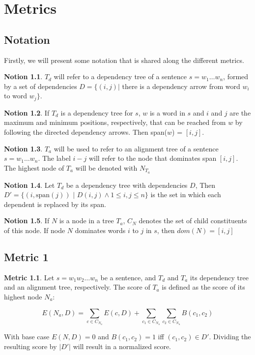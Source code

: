 \documentclass{report}
\theoremstyle{definition}
\newtheorem{metric}{Metric}
\newtheorem{notion}{Notion}
\theoremstyle{plain}
\begin{document}
\appendix
\chapter{Metrics}

\section{Notation}

Firstly, we will present some notation that is shared along the different metrics.

\begin{notion}
$T_d$ will refer to a dependency tree of a sentence $s = w_1 \dots w_n$, formed by a set of dependencies $D = \{ (i,j) |$ there is a dependency arrow from word $w_i$ to word $w_j \}$.
\end{notion}

\begin{notion}
If $T_d$ is a dependency tree for $s$, $w$ is a word in $s$ and $i$ and $j$ are the maximum and minimum positions, respectively, that can be reached from $w$ by following the directed dependency arrows. Then span($w$) = $[i,j]$.
\end{notion}

\begin{notion}
$T_a$ will be used to refer to an alignment tree of a sentence $s = w_1 \dots w_n$. The label $i-j$ will refer to the node that dominates span $[i,j]$. The highest node of $T_a$ will be denoted with $N_{T_a}$
\end{notion}

\begin{notion}
Let $T_d$ be a dependency tree with dependencies $D$, Then $D' = \{ (i,\textrm{span}(j))$ $|$ $D(i,j) \land 1 \leq i,j \leq n \}$ is the set in which each dependent is replaced by its span.
\end{notion}

\begin{notion}
If $N$ is a node in a tree $T_a$, $C_N$ denotes the set of child constituents of this node. If node $N$ dominates words $i$ to $j$ in $s$, then $dom(N)= [i,j]$
\end{notion}

\section{Metric 1}

\begin{metric}\label{m1}
Let $s = w_1 w_2 \dots w_n$ be a sentence, and $T_d$ and $T_a$ its dependency tree and an alignment tree, respectively. The score of $T_a$ is defined as the score of its highest node $N_{a}$:

$$
E(N_a,D) = \sum_{c\in C_{N_a}} E(c,D)+ \sum_{c_1\in C_{N_a}} \sum_{c_2\in C_{N_a}} B(c_1,c_2)
$$

\noindent With base case $E(N,D) = 0$ and $B(c_1,c_2) = 1$ iff  $(c_1,c_2)\in D'$. Dividing the resulting score by $|D'|$ will result in a normalized score.
\end{metric}
\end{document}
